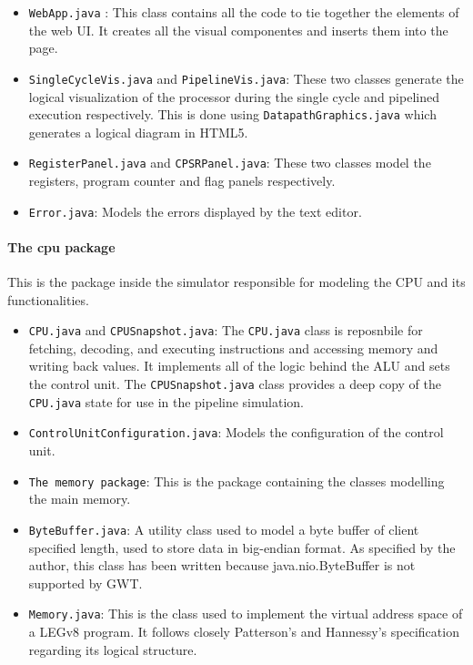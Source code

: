 \begin{itemize}
	\item \verb|WebApp.java| : This class contains all the code to tie together the elements of the web UI. It creates all the visual componentes and inserts them into the page.
	\item \verb|SingleCycleVis.java| and \verb|PipelineVis.java|: \newline These two classes generate the logical visualization of the processor during the single cycle and pipelined execution respectively. This is done using \verb|DatapathGraphics.java| which generates a logical diagram in HTML5.
	\item \verb|RegisterPanel.java| and \verb|CPSRPanel.java|: \newline These two classes model the registers, program counter and flag panels respectively.
	\item \verb|Error.java|: \newline Models the errors displayed by the text editor.
\end{itemize}

\paragraph*{The cpu package}

This is the package inside the simulator responsible for modeling the CPU and its functionalities.

\begin{itemize}
\item \verb|CPU.java| and \verb|CPUSnapshot.java|: \newline The \verb|CPU.java| class is reposnbile for fetching, decoding, and executing instructions and accessing memory and writing back values. It implements all of the logic behind the ALU and sets the control unit. The \verb|CPUSnapshot.java| class provides a deep copy of the \verb|CPU.java| state for use in the pipeline simulation.
\item \verb|ControlUnitConfiguration.java|: \newline Models the configuration of the control unit.
\item \verb|The memory package|: \newline This is the package containing the classes modelling the main memory.
\item \verb|ByteBuffer.java|: \newline A utility class used to model a byte buffer of client specified length, used to store data in big-endian format. As specified by the author, this class has been written because java.nio.ByteBuffer is not supported by GWT.
\item \verb|Memory.java|: \newline This is the class used to implement the virtual address space of a LEGv8 program. It follows closely Patterson's and Hannessy's specification regarding its logical structure.
\end{itemize}



